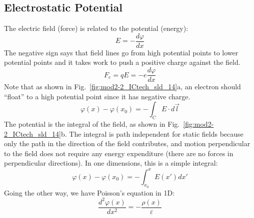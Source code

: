 \subsection{Electrostatic Potential}
The electric field (force) is related to the potential (energy):
    \begin{equation} 
        E =  - \frac{{d\varphi }}{{dx}} 
    \end{equation}
The negative sign says that field lines go from high potential points to lower potential points and it takes work to push a positive charge against the field.
    \begin{equation} 
        {F_e} = qE =  - e\frac{{d\varphi }}{{dx}} 
    \end{equation}
Note that as shown in Fig.~\ref{fig:mod2-2_ICtech_sld_14}a, an electron should “float” to a high potential point since it has negative charge.   
    \begin{equation} 
        \varphi (x) - \varphi ({x_0}) =  - \int_C {E \cdot d\vec l} 
    \end{equation}
The potential is the integral of the field, as shown in Fig.~\ref{fig:mod2-2_ICtech_sld_14}b.  The integral is path independent for static fields because only the path in the direction of the field contributes, and motion perpendicular to the field does not require any energy expenditure (there are no forces in perpendicular directions).    In one dimensions, this is a simple integral:
    \begin{equation} 
        \varphi (x) - \varphi ({x_0}) =  - \int_{{x_0}}^x {E(x')dx'}  
    \end{equation}
Going the other way, we have Poisson’s equation in 1D:
    \begin{equation} 
        \frac{{{d^2}\varphi (x)}}{{d{x^2}}} =  - \frac{{\rho (x)}}{\varepsilon }
    \end{equation}
